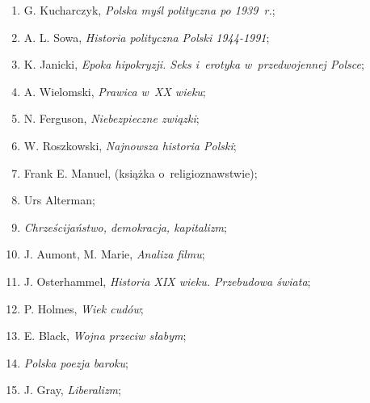 \documentclass[a4paper,11pt]{article}
\begin{document}
\begin{enumerate}
\item G. Kucharczyk, \textit{Polska myśl polityczna po 1939~r.};



\item A. L. Sowa, \textit{Historia polityczna Polski 1944-1991};



\item K. Janicki, \textit{Epoka hipokryzji. Seks i~erotyka
    w~przedwojennej Polsce};



\item A. Wielomski, \textit{Prawica w~XX wieku};



\item N. Ferguson, \textit{Niebezpieczne związki};



\item W. Roszkowski, \textit{Najnowsza historia Polski};



\item Frank E. Manuel, (książka o~religioznawstwie);



\item Urs Alterman;



\item \textit{Chrześcijaństwo, demokracja, kapitalizm};



\item J. Aumont, M. Marie, \textit{Analiza filmu};



\item J. Osterhammel, \textit{Historia XIX wieku. Przebudowa świata};



\item P. Holmes, \textit{Wiek cudów};



\item E. Black, \textit{Wojna przeciw słabym};



\item \textit{Polska poezja baroku};



\item J. Gray, \textit{Liberalizm};




\end{enumerate}
\end{document}
